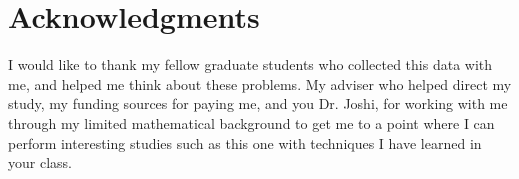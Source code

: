 \documentclass[12pt]{article}
\begin{document}
\section{Acknowledgments}
I would like to thank my fellow graduate students who collected this data with me, and helped me think about these problems. My adviser who helped direct my study, my funding sources for paying me, and you Dr. Joshi, for working with me through my limited mathematical background to get me to a point where I can perform interesting studies such as this one with techniques I have learned in your class.




\end{document}
